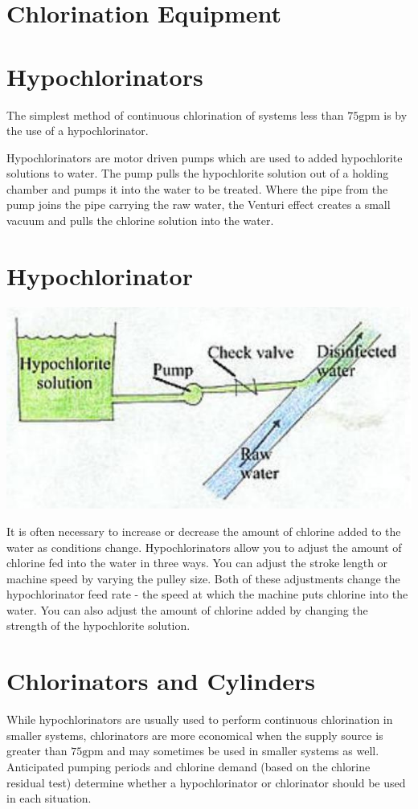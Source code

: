 \documentclass[10pt]{article}
\begin{document}
\section{Chlorination Equipment}
\section{Hypochlorinators}
The simplest method of continuous chlorination of systems less than $75 \mathrm{gpm}$ is by the use of a hypochlorinator.

Hypochlorinators are motor driven pumps which are used to added hypochlorite solutions to water. The pump pulls the hypochlorite solution out of a holding chamber and pumps it into the water to be treated. Where the pipe from the pump joins the pipe carrying the raw water, the Venturi effect creates a small vacuum and pulls the chlorine solution into the water.

\section{Hypochlorinator}
\includegraphics[max width=\textwidth]{2022_10_14_eba0aec33b37be0fbdf2g-13}

It is often necessary to increase or decrease the amount of chlorine added to the water as conditions change. Hypochlorinators allow you to adjust the amount of chlorine fed into the water in three ways. You can adjust the stroke length or machine speed by varying the pulley size. Both of these adjustments change the hypochlorinator feed rate - the speed at which the machine puts chlorine into the water. You can also adjust the amount of chlorine added by changing the strength of the hypochlorite solution.

\section{Chlorinators and Cylinders}
While hypochlorinators are usually used to perform continuous chlorination in smaller systems, chlorinators are more economical when the supply source is greater than $75 \mathrm{gpm}$ and may sometimes be used in smaller systems as well. Anticipated pumping periods and chlorine demand (based on the chlorine residual test) determine whether a hypochlorinator or chlorinator should be used in each situation.
\end{document}
